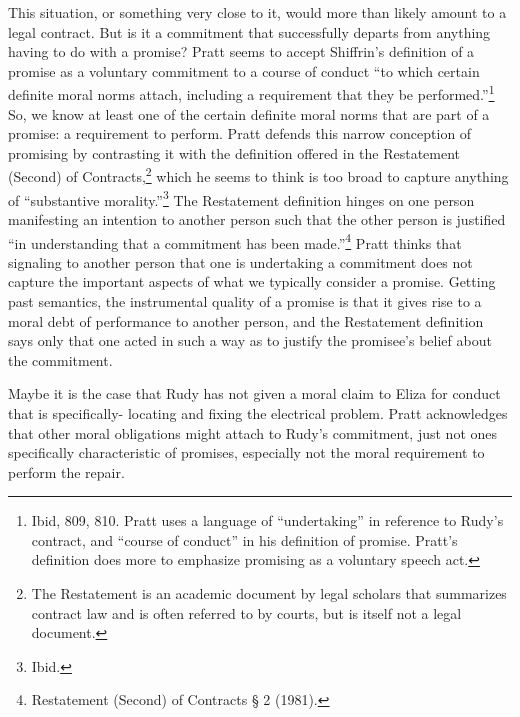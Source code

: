 This situation, or something very close to it, would more than likely
amount to a legal contract. But is it a commitment that successfully
departs from anything having to do with a promise? Pratt seems to accept
Shiffrin's definition of a promise as a voluntary commitment to a course
of conduct ``to which certain definite moral norms attach, including a
requirement that they be performed.''\footnote{Ibid, 809, 810. Pratt
  uses a language of ``undertaking'' in reference to Rudy's contract,
  and ``course of conduct'' in his definition of promise. Pratt's
  definition does more to emphasize promising as a voluntary speech act.}
So, we know at least one of the certain definite moral norms that are
part of a promise: a requirement to perform. Pratt defends this narrow
conception of promising by contrasting it with the definition offered in
the Restatement (Second) of Contracts,\footnote{The Restatement is an
  academic document by legal scholars that summarizes contract law and
  is often referred to by courts, but is itself not a legal document.}
which he seems to think is too broad to capture anything of
``substantive morality.''\footnote{Ibid.} The Restatement definition
hinges on one person manifesting an intention to another person such
that the other person is justified ``in understanding that a commitment
has been made.''\footnote{Restatement (Second) of Contracts § 2 (1981).}
Pratt thinks that signaling to another person that one is undertaking a
commitment does not capture the important aspects of what we typically
consider a promise. Getting past semantics, the instrumental quality of
a promise is that it gives rise to a moral debt of performance to
another person, and the Restatement definition says only that one acted
in such a way as to justify the promisee's belief about the commitment.

Maybe it is the case that Rudy has not given a moral claim to Eliza for
conduct that is specifically- locating and fixing the electrical
problem. Pratt acknowledges that other moral obligations might attach to
Rudy's commitment, just not ones specifically characteristic of
promises, especially not the moral requirement to perform the repair.

